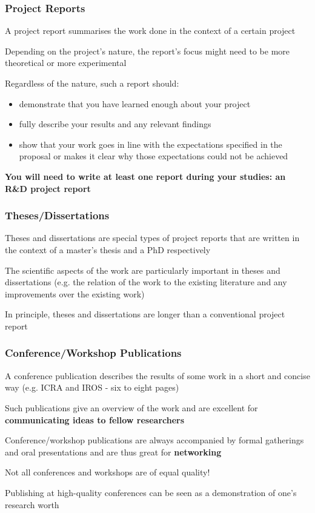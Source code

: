 \documentclass{beamer}
\begin{document}
\begin{frame}
\frametitle{Project Reports}
    \vspace{-0.5cm}
    A project report summarises the work done in the context of a certain project
    \newline

    Depending on the project's nature, the report's focus might need to be more theoretical or more experimental
    \newline

    Regardless of the nature, such a report should:
    \begin{itemize}
        \item demonstrate that you have learned enough about your project
        \item fully describe your results and any relevant findings
        \item show that your work goes in line with the expectations specified in the proposal or makes it clear why those expectations could not be achieved
        \newline
    \end{itemize}

    \textbf{You will need to write at least one report during your studies: an R\&D project report}
\end{frame}

\begin{frame}
\frametitle{Theses/Dissertations}
    Theses and dissertations are special types of project reports that are written in the context of a master's thesis and a PhD respectively
    \newline

    The scientific aspects of the work are particularly important in theses and dissertations (e.g. the relation of the work to the existing literature and any improvements over the existing work)
    \newline

    In principle, theses and dissertations are longer than a conventional project report
\end{frame}

\begin{frame}
\frametitle{Conference/Workshop Publications}
    \vspace{-1cm}
    A conference publication describes the results of some work in a short and concise way (e.g. ICRA and IROS - six to eight pages)
    \newline

    Such publications give an overview of the work and are excellent for \textbf{communicating ideas to fellow researchers}
    \newline

    Conference/workshop publications are always accompanied by formal gatherings and oral presentations and are thus great for \textbf{networking}
    \newline

    Not all conferences and workshops are of equal quality!
    \newline

    Publishing at high-quality conferences can be seen as a demonstration of one's research worth
\end{frame}
\end{document}

